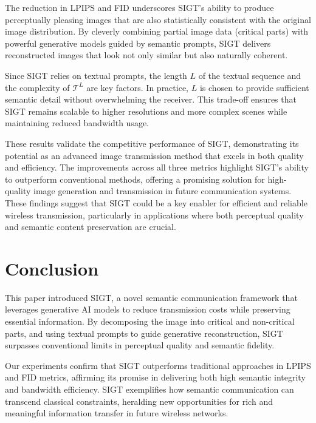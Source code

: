 \documentclass[conference]{IEEEtran}
\begin{document}
The reduction in LPIPS and FID underscores SIGT's ability to produce perceptually pleasing images that are also statistically consistent with the original image distribution. By cleverly combining partial image data (critical parts) with powerful generative models guided by semantic prompts, SIGT delivers reconstructed images that look not only similar but also naturally coherent.

Since SIGT relies on textual prompts, the length $L$ of the textual sequence and the complexity of $\mathcal{T}^{L}$ are key factors. In practice, $L$ is chosen to provide sufficient semantic detail without overwhelming the receiver. This trade-off ensures that SIGT remains scalable to higher resolutions and more complex scenes while maintaining reduced bandwidth usage.

These results validate the competitive performance of SIGT, demonstrating its potential as an advanced image transmission method that excels in both quality and efficiency. The improvements across all three metrics highlight SIGT's ability to outperform conventional methods, offering a promising solution for high-quality image generation and transmission in future communication systems. These findings suggest that SIGT could be a key enabler for efficient and reliable wireless transmission, particularly in applications where both perceptual quality and semantic content preservation are crucial.



\section{Conclusion}
This paper introduced SIGT, a novel semantic communication framework that leverages generative AI models to reduce transmission costs while preserving essential information. By decomposing the image into critical and non-critical parts, and using textual prompts to guide generative reconstruction, SIGT surpasses conventional limits in perceptual quality and semantic fidelity.

Our experiments confirm that SIGT outperforms traditional approaches in LPIPS and FID metrics, affirming its promise in delivering both high semantic integrity and bandwidth efficiency. SIGT exemplifies how semantic communication can transcend classical constraints, heralding new opportunities for rich and meaningful information transfer in future wireless networks.
\end{document}
